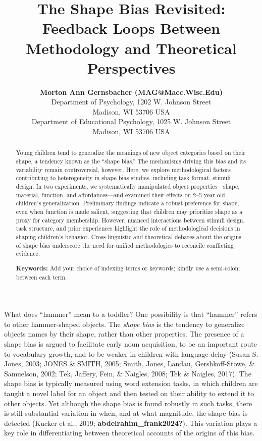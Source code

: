 \documentclass[10pt, letterpaper]{article}
\title{The Shape Bias Revisited: Feedback Loops Between Methodology and
Theoretical Perspectives}
\author{{\large \bf Morton Ann Gernsbacher (MAG@Macc.Wisc.Edu)} \\ Department of Psychology, 1202 W. Johnson Street \\ Madison, WI 53706 USA \AND {\large \bf Sharon J.~Derry (SDJ@Macc.Wisc.Edu)} \\ Department of Educational Psychology, 1025 W. Johnson Street \\ Madison, WI 53706 USA}
\begin{document}
\maketitle

\begin{abstract}
Young children tend to generalize the meanings of new object categories
based on their shape, a tendency known as the ``shape bias.'' The
mechanisms driving this bias and its variability remain controversial,
however. Here, we explore methodological factors contributing to
heterogeneity in shape bias studies, including task format, stimuli
design. In two experiments, we systematically manipulated object
properties---shape, material, function, and affordances---and examined
their effects on 2--5 year-old children's generalization. Preliminary
findings indicate a robust preference for shape, even when function is
made salient, suggesting that children may prioritize shape as a proxy
for category membership. However, nuanced interactions between stimuli
design, task structure, and prior experiences highlight the role of
methodological decisions in shaping children's behavior.
Cross-linguistic and theoretical debates about the origins of shape bias
underscore the need for unified methodologies to reconcile conflicting
evidence.

\textbf{Keywords:}
Add your choice of indexing terms or keywords; kindly use a semi-colon;
between each term.
\end{abstract}

What does ``hammer'' mean to a toddler? One possibility is that
``hammer'' refers to other hammer-shaped objects. The \emph{shape bias}
is the tendency to generalize objects names by their shape, rather than
other properties. The presence of a shape bias is argued to facilitate
early noun acquisition, to be an important route to vocabulary growth,
and to be weaker in children with language delay (Susan S. Jones, 2003;
JONES \& SMITH, 2005; Smith, Jones, Landau, Gershkoff-Stowe, \&
Samuelson, 2002; Tek, Jaffery, Fein, \& Naigles, 2008; Tek \& Naigles,
2017). The shape bias is typically measured using word extension tasks,
in which children are taught a novel label for an object and then tested
on their ability to extend it to other objects. Yet although the shape
bias is found robustly in such tasks, there is still substantial
variation in when, and at what magnitude, the shape bias is detected
(Kucker et al., 2019; \textbf{abdelrahim\_frank2024?}). This variation
plays a key role in differentiating between theoretical accounts of the
origins of this bias.
\end{document}
